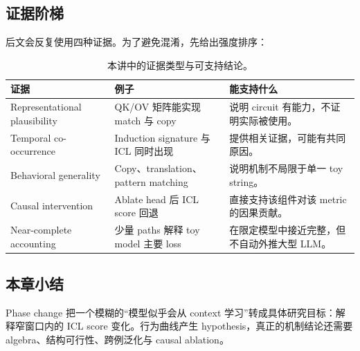 
\subsection{证据阶梯}

后文会反复使用四种证据。为了避免混淆，先给出强度排序：
\begin{table}[H]
\centering
\small
\caption{本讲中的证据类型与可支持结论。}
\begin{tabularx}{\textwidth}{L{0.21\textwidth}L{0.28\textwidth}X}
\toprule
证据 & 例子 & 能支持什么 \\
\midrule
Representational plausibility & QK/OV 矩阵能实现 match 与 copy & 说明 circuit 有能力，不证明实际被使用。 \\
Temporal co-occurrence & Induction signature 与 ICL 同时出现 & 提供相关证据，可能有共同原因。 \\
Behavioral generality & Copy、translation、pattern matching & 说明机制不局限于单一 toy string。 \\
Causal intervention & Ablate head 后 ICL score 回退 & 直接支持该组件对该 metric 的因果贡献。 \\
Near-complete accounting & 少量 paths 解释 toy model 主要 loss & 在限定模型中接近完整，但不自动外推大型 LLM。 \\
\bottomrule
\end{tabularx}
\end{table}

\subsection{本章小结}

Phase change 把一个模糊的“模型似乎会从 context 学习”转成具体研究目标：解释窄窗口内的 ICL score 变化。行为曲线产生 hypothesis，真正的机制结论还需要 algebra、结构可行性、跨例泛化与 causal ablation。

